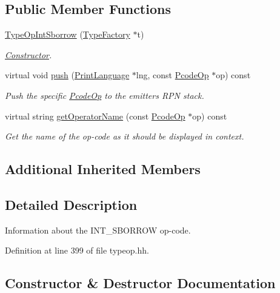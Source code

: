 \subsection*{Public Member Functions}
\begin{DoxyCompactItemize}
\item 
\mbox{\hyperlink{class_type_op_int_sborrow_aefb5d25cc15ebfb68993201133604592}{Type\+Op\+Int\+Sborrow}} (\mbox{\hyperlink{class_type_factory}{Type\+Factory}} $\ast$t)
\begin{DoxyCompactList}\small\item\em \mbox{\hyperlink{class_constructor}{Constructor}}. \end{DoxyCompactList}\item 
virtual void \mbox{\hyperlink{class_type_op_int_sborrow_a7740e907f2867bcb2e15285232fc9b50}{push}} (\mbox{\hyperlink{class_print_language}{Print\+Language}} $\ast$lng, const \mbox{\hyperlink{class_pcode_op}{Pcode\+Op}} $\ast$op) const
\begin{DoxyCompactList}\small\item\em Push the specific \mbox{\hyperlink{class_pcode_op}{Pcode\+Op}} to the emitter\textquotesingle{}s R\+PN stack. \end{DoxyCompactList}\item 
virtual string \mbox{\hyperlink{class_type_op_int_sborrow_a37fb242170777c7eae6afb2a993979e0}{get\+Operator\+Name}} (const \mbox{\hyperlink{class_pcode_op}{Pcode\+Op}} $\ast$op) const
\begin{DoxyCompactList}\small\item\em Get the name of the op-\/code as it should be displayed in context. \end{DoxyCompactList}\end{DoxyCompactItemize}
\subsection*{Additional Inherited Members}


\subsection{Detailed Description}
Information about the I\+N\+T\+\_\+\+S\+B\+O\+R\+R\+OW op-\/code. 

Definition at line 399 of file typeop.\+hh.



\subsection{Constructor \& Destructor Documentation}
\mbox{\label{class_type_op_int_sborrow_aefb5d25cc15ebfb68993201133604592}} 
